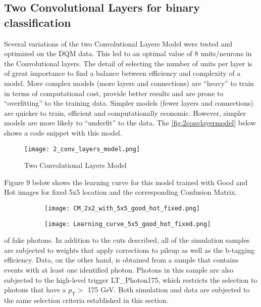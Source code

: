 \subsection{Two Convolutional Layers for binary classification}
Several variations of the two Convolutional Layers Model were tested and optimized on the DQM data. This led to an optimal value of 8 units/neurons in the Convolutional layers. 
The detail of selecting the number of units per layer is of great importance to find a balance between efficiency and complexity of a model. More complex models (more layers and connections) are “heavy” to train in terms of computational cost, provide better results and are prone to “overfitting” to the training data.
 Simpler models (fewer layers and connections) are quicker to train, efficient and computationally economic. However, simpler models are more likely to “underfit” to the data. The \autoref{fig:2convlayermodel} below shows a code snippet with this model.


\begin{figure}
\begin{center}
    \texttt{[image: 2\_conv\_layers\_model.png]}
\end{center}
\caption{Two Convolutional Layers Model\label{fig:2convlayermodel}}
\end{figure}


Figure 9 below shows the learning curve for this model trained with Good and Hot images for fixed 5x5 location and the corresponding Confusion Matrix.

\begin{figure}
\centering
	\begin{subfigure}{.45\textwidth}
 	\texttt{[image: CM\_2x2\_with\_5x5\_good\_hot\_fixed.png]}
	\end{subfigure}
	\begin{subfigure}{.45\textwidth}
	\texttt{[image: Learning\_curve\_5x5\_good\_hot\_fixed.png]}
	\end{subfigure}
 \end{figure}
  of fake photons. In addition to the cuts described, all of the simulation samples are subjected to weights that apply corrections to pileup as well as the b-tagging efficiency. Data, on the other hand, is obtained from a sample that contains events with at least one identified photon. Photons in this sample are also subjected to the high-level trigger LT\_Photon175, which restricts the selection to photons that have a $p_\text{T} >$ 175 GeV. Both simulation and data are subjected to the same selection criteria established in this section. 

